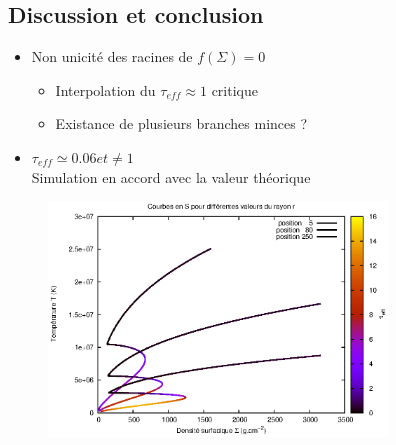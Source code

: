 \documentclass[french]{beamer}
\begin{document}
\begin{frame}
\section{Discussion et conclusion}
\begin{itemize}

\item Non unicité des racines de $f(\Sigma) = 0$
\\
\begin{itemize}
\item Interpolation du $\tau_{eff} \approx 1$ critique
\item Existance de plusieurs branches minces ? 
\end{itemize}  
 

\item $\tau_{eff} \simeq 0.06 et \neq 1$ 
\\
Simulation en accord avec la valeur théorique

\end{itemize}

\end{frame}

\begin{frame}
\begin{figure}[htb!]
\includegraphics[width=9cm]{figures/S_curves_tau.eps}
\end{figure}
\end{frame}
\end{document}
